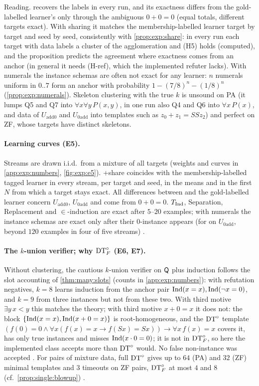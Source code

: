 Reading. \DTRC{} recovers the labels in every run, and its exactness differs from the gold-labelled learner's only through the ambiguous $0+0=0$ (equal totals, different targets exact). With sharing it matches the membership-labelled learner target by target and seed by seed, consistently with \cref{prop:exp:share}: in every run each target with data labels a cluster of the agglomeration and (H5) holds (computed), and the proposition predicts the agreement where exactness comes from an anchor (in general it needs (H-ref), which the implemented refuter lacks). With numerals the instance schemas are often not exact for any learner: $n$ numerals uniform in $0..7$ form an anchor with probability $1-(7/8)^n-(1/8)^n$ (\cref{prop:exp:numerals}). Skeleton clustering with the true $k$ is unsound on PA (it lumps Q5 and Q7 into $\forall x\forall y\,P(x,y)$, in one run also Q4 and Q6 into $\forall x\,P(x)$, and data of $U_{\mathrm{add0}}$ and $U_{\mathrm{0add}}$ into templates such as $z_0+z_1=SSz_2$) and perfect on ZF, whose targets have distinct skeletons.

\paragraph{Learning curves (E5).}
Streams are drawn i.i.d.\ from a mixture of all targets (weights and curves in \cref{app:exp:numbers}, \cref{fig:exp:e5}). \DTRC{}+share coincides with the membership-labelled tagged learner in every stream, per target and seed, in the means and in the first $N$ from which a target stays exact. All differences between \DTRC{} and the gold-labelled learner concern $U_{\mathrm{add0}}$, $U_{\mathrm{0add}}$ and come from $0+0=0$. $T_{\mathrm{Ind}}$, Separation, Replacement and $\in$-induction are exact after $5$--$20$ examples; with numerals the instance schemas are exact only after their $0$-instance appears (for \DTRC{} on $U_{\mathrm{0add}}$, beyond $120$ examples in four of five streams) .

\paragraph{The $k$-union verifier; why $\mathrm{DT}^{\circ}_{F}$ (E6, E7).}
Without clustering, the cautious $k$-union verifier on $\mathsf{Q}$ plus induction follows the slot accounting of \cref{thm:many:slots} (counts in \cref{app:exp:numbers}): with refutation negatives, $k=8$ learns induction from the anchor pair $\mathrm{Ind}(x=x),\mathrm{Ind}(\neg x=0)$, and $k=9$ from three instances but not from these two. With third motive $\exists y\,x<y$ this matches the theory; with third motive $x+0=x$ it does not: the block $\{\mathrm{Ind}(x=x),\mathrm{Ind}(x+0=x)\}$ is root-homogeneous, and the $\mathrm{DT}^{\circ}$ template $(f(0)=0\wedge\forall x(f(x)=x\to f(Sx)=Sx))\to\forall x\,f(x)=x$ covers it, has only true instances and misses $\mathrm{Ind}(x\cdot0=0)$; it is not in $\mathrm{DT}^{\circ}_{F}$, so here the implemented class accepts more than $\mathrm{DT}^{\circ}$ would. No false non-instance was accepted . For pairs of mixture data, full $\mathrm{DT}^{\circ}$ gives up to $64$ (PA) and $32$ (ZF) minimal templates and $3$ timeouts on ZF pairs, $\mathrm{DT}^{\circ}_{F}$ at most $4$ and $8$ (cf.\ \cref{prop:single:blowup}) .

